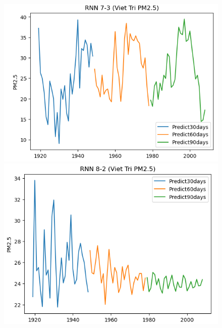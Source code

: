\begin{figure}[H]
    \begin{minipage}{0.15\textwidth}
    \centering
    \includegraphics[width=1\textwidth]{img/final/RNN/90D/RNN_7_3_VT_90D.png}
    \end{minipage}
    \hfill
    \begin{minipage}{0.15\textwidth}
    \centering
    \includegraphics[width=1\textwidth]{img/final/RNN/90D/RNN_8_2_VT_90D.png}
    \end{minipage}
    \hfill
    \begin{minipage}{0.15\textwidth}
    \centering

\end{minipage}
\end{figure}
